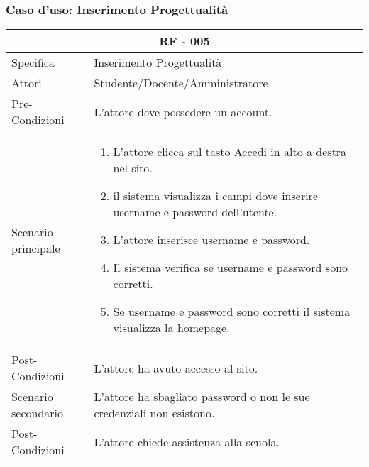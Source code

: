 \documentclass{article}
\begin{document}
\subsubsection{\textbf{Caso d'uso: Inserimento Progettualità}}
\begin{tabular}{ |p{3cm}|p{9cm}|  }
	\hline
	\multicolumn{2}{|c|}{\textbf{RF - 005}} \\
	\hline
	Specifica& Inserimento Progettualità\\
	\hline
	Attori& Studente/Docente/Amministratore\\
	\hline
	Pre-Condizioni& L'attore deve possedere un account.\\
	\hline
	Scenario principale& \begin{enumerate}
		\item L'attore clicca sul tasto Accedi in alto a destra nel sito.
		\item il sistema visualizza i campi dove inserire username e password dell'utente.
		\item L'attore inserisce username e password.
		\item Il sistema verifica se username e password sono corretti.
		\item Se username e password sono corretti il sistema visualizza la homepage.
	\end{enumerate}\\
	\hline
	Post-Condizioni& L'attore ha avuto accesso al sito.\\
	\hline
	Scenario secondario& L'attore ha sbagliato password o non le sue credenziali non esistono.\\
	\hline
	Post-Condizioni& L'attore chiede assistenza alla scuola.\\
	\hline
\end{tabular}
\end{document}
